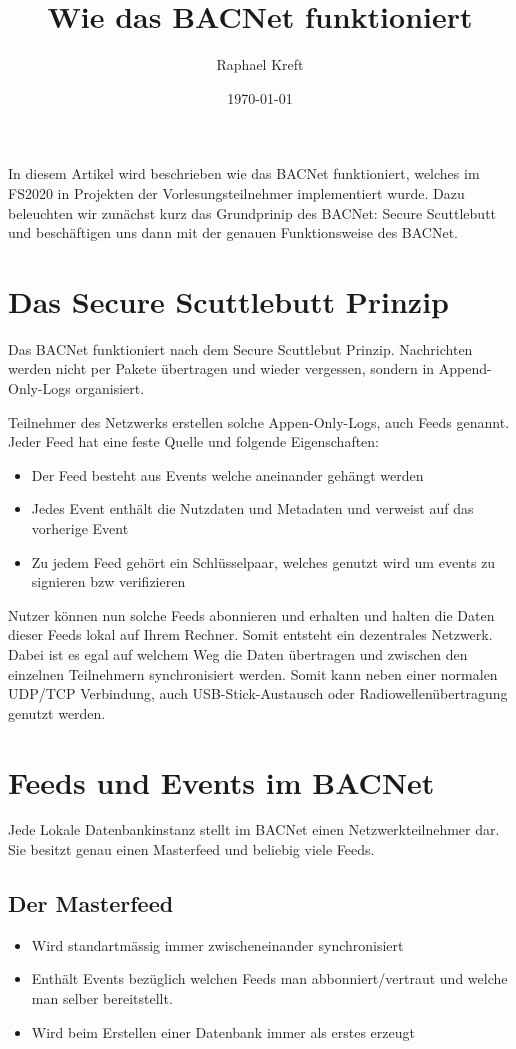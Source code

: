 \documentclass[a4paper, fontsize=9pt, oneside, headsepline=.5pt,footsepline=.5pt]{scrartcl}
\title{Wie das BACNet funktioniert}
\author{Raphael Kreft}
\date{\today}
\begin{document}
\maketitle
\tableofcontents
\clearpage
\setcounter{page}{1}

In diesem Artikel wird beschrieben wie das BACNet funktioniert, welches im FS2020 in Projekten der Vorlesungsteilnehmer implementiert wurde.
Dazu beleuchten wir zunächst kurz das Grundprinip des BACNet: Secure Scuttlebutt und beschäftigen uns dann mit der genauen Funktionsweise des BACNet.

\section{Das Secure Scuttlebutt Prinzip}
Das BACNet funktioniert nach dem Secure Scuttlebut Prinzip. Nachrichten werden nicht per Pakete übertragen und wieder vergessen, sondern in Append-Only-Logs organisiert.

Teilnehmer des Netzwerks erstellen solche Appen-Only-Logs, auch Feeds genannt. Jeder Feed hat eine feste Quelle und folgende Eigenschaften:
\begin{itemize}
    \item Der Feed besteht aus Events welche aneinander gehängt werden
    \item Jedes Event enthält die Nutzdaten und Metadaten und verweist auf das vorherige Event
    \item Zu jedem Feed gehört ein Schlüsselpaar, welches genutzt wird um events zu signieren bzw verifizieren
\end{itemize}

Nutzer können nun solche Feeds abonnieren und erhalten und halten die Daten dieser Feeds lokal auf Ihrem Rechner. Somit entsteht ein dezentrales Netzwerk.
Dabei ist es egal auf welchem Weg die Daten übertragen und zwischen den einzelnen Teilnehmern synchronisiert werden. Somit kann neben einer normalen UDP/TCP Verbindung, auch USB-Stick-Austausch oder Radiowellenübertragung genutzt werden.

\section{Feeds und Events im BACNet}
Jede Lokale Datenbankinstanz stellt im BACNet einen Netzwerkteilnehmer dar. Sie besitzt genau einen Masterfeed und beliebig viele Feeds.
\subsection{Der Masterfeed}
\begin{itemize}
    \item Wird standartmässig immer zwischeneinander synchronisiert
    \item Enthält Events bezüglich welchen Feeds man abbonniert/vertraut und welche man selber bereitstellt.
    \item Wird beim Erstellen einer Datenbank immer als erstes erzeugt
\end{itemize}
\end{document}
